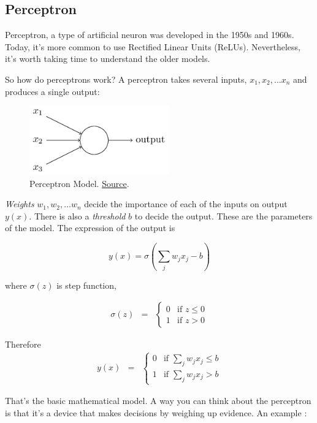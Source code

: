 \documentclass[a4paper]{tufte-handout}
\begin{document}
\subsection{Perceptron}\label{perceptron}

Perceptron, a type of artificial neuron was developed in the 1950s and
1960s. Today, it's more common to use Rectified Linear Units (ReLUs).
Nevertheless, it's worth taking time to understand the older models.

So how do perceptrons work? A perceptron takes several inputs,
\(x_1, x_2, \ldots x_n\) and produces a single output:


\begin{figure}
  \includegraphics[width=60mm]{tikz0}
  \caption{ Perceptron Model.
\href{http://neuralnetworksanddeeplearning.com/chap1.html}{Source}. }
\end{figure}


\emph{Weights} \(w_1, w_2, \ldots w_n\) decide the importance of each of
the inputs on output \(y(x)\). There is also a \emph{threshold} \(b\) to
decide the output. These are the parameters of the model.
The expression of the output is

\[ y(x) = \sigma\left(\sum_j w_j x_j - b\right) \]

where \(\sigma(z)\) is step function, 

\begin{eqnarray*}
  \sigma(z) & = & \left\{ \begin{array}{ll}
      0 & \mbox{if } z \leq 0 \\
      1 & \mbox{if } z > 0
      \end{array} \right.
\end{eqnarray*}

Therefore 
\begin{eqnarray*}
    y(x) & = & \left\{ \begin{array}{ll}
      0 & \mbox{if } \sum_j w_j x_j \leq b \\
      1 & \mbox{if } \sum_j w_j x_j > b
      \end{array} \right.
\end{eqnarray*}

That's the basic mathematical model. A way you can think about the
perceptron is that it's a device that makes decisions by weighing up
evidence. An example
:
\end{document}
